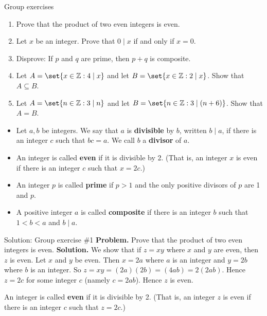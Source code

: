 \documentclass[10pt]{beamer}
\begin{document}
\begin{frame}{Group exercises}
\begin{enumerate}
	\item  Prove that the product of two even integers is even.
	\item  Let $x$ be an integer. Prove that $0 \mid x$ if and only if $x=0$.
	\item Disprove: If $p$ and $q$ are prime, then $p+q$ is composite.
	\item Let $A = \set{x \in \mathbb{Z} : 4 \mid x}$ and let $B = \set{x \in \mathbb{Z} : 2 \mid x}$. Show that $A \subseteq B$. 
	\item Let $A = \set{n \in \mathbb{Z} : 3 \mid n}$ and let $B = \set{n \in \mathbb{Z} : 3 \mid (n+6)}$. Show that $A=B$. 
\end{enumerate}
\vfill
\small 
\begin{mygreenbox}[title={Reference: Definitions}]
\begin{itemize}
	\item Let $a,b$ be integers.  We say that $a$ is \textbf{divisible} by $b$, written $b \mid a$, if there is an integer $c$ such that $bc=a$. We call $b$ a \textbf{divisor} of $a$.
	\item An integer is called \textbf{even} if it is divisible by 2. (That is, an integer $x$ is even if there is an integer $c$ such that $x=2c$.)
	\item An integer $p$ is called \textbf{prime} if $p>1$ and the only positive divisors of $p$ are 1 and $p$.
	\item A positive integer $a$ is called \textbf{composite} if there is an integer $b$ such that  $1<b<a$ and $b \mid a$.
\end{itemize}
	
\end{mygreenbox}

\end{frame}





\begin{frame}{Solution: Group exercise \#1}
\textbf{Problem.} Prove that the product of two even integers is even.
\vfill 
\textbf{Solution.}   We show that if $z=xy$ where $x$ and $y$ are even, then $z$ is even.   Let $x$ and $y$ be even.  Then $x=2a$ where $a$ is an integer and $y=2b$ where $b$ is an integer.  So $z=xy=(2a)(2b)=(4ab)=2(2ab)$. Hence $z=2c$ for some integer $c$ (namely $c= 2ab$).  Hence $z$ is even. 

\vfill
\begin{mygreenbox}[title={Reference: Definition}]
An integer is called \textbf{even} if it is divisible by 2. (That is, an integer $z$ is even if there is an integer $c$ such that $z=2c$.)
\end{mygreenbox}

\end{frame}
\end{document}
